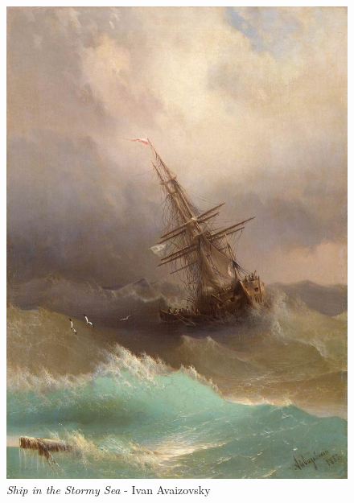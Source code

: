 \documentclass[a4paper]{article}
\begin{document}
\begin {figure}[h!]
\begin{minipage}[b]{.49\textwidth}
	\includegraphics[width=\textwidth]{SeaPaintings/_Stl__aivazovskyshipinstormysea.jpg}
    \caption{\emph{Ship in the Stormy Sea} - Ivan Avaizovsky}
\end{minipage}
\end{figure}
\end{document}
